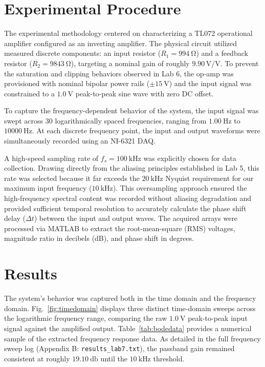 \documentclass[11pt]{article}
\begin{document}
\section{Experimental Procedure}
The experimental methodology centered on characterizing a TL072 operational amplifier configured as an inverting amplifier. The physical circuit utilized measured discrete components: an input resistor ($R_1 = \SI{994}{\ohm}$) and a feedback resistor ($R_2 = \SI{9843}{\ohm}$), targeting a nominal gain of roughly $9.90\,\text{V/V}$. To prevent the saturation and clipping behaviors observed in Lab 6, the op-amp was provisioned with nominal bipolar power rails ($\pm \SI{15}{\volt}$) and the input signal was constrained to a $\SI{1.0}{\volt}$ peak-to-peak sine wave with zero DC offset.

To capture the frequency-dependent behavior of the system, the input signal was swept across 30 logarithmically spaced frequencies, ranging from $\SI{1.00}{\hertz}$ to $\SI{10000}{\hertz}$. At each discrete frequency point, the input and output waveforms were simultaneously recorded using an NI-6321 DAQ.

A high-speed sampling rate of $f_s = \SI{100}{\kilo\hertz}$ was explicitly chosen for data collection. Drawing directly from the aliasing principles established in Lab 5, this rate was selected because it far exceeds the $\SI{20}{\kilo\hertz}$ Nyquist requirement for our maximum input frequency ($\SI{10}{\kilo\hertz}$). This oversampling approach ensured the high-frequency spectral content was recorded without aliasing degradation and provided sufficient temporal resolution to accurately calculate the phase shift delay ($\Delta t$) between the input and output waves. The acquired arrays were processed via MATLAB to extract the root-mean-square (RMS) voltages, magnitude ratio in decibels (dB), and phase shift in degrees.

\section{Results}
The system's behavior was captured both in the time domain and the frequency domain. Fig.~\ref{fig:timedomain} displays three distinct time-domain sweeps across the logarithmic frequency range, comparing the raw $\SI{1.0}{\volt}$ peak-to-peak input signal against the amplified output. Table~\ref{tab:bodedata} provides a numerical sample of the extracted frequency response data. As detailed in the full frequency sweep log (Appendix B: \texttt{results\_lab7.txt}), the passband gain remained consistent at roughly $\SI{19.10}{\decibel}$ until the $\SI{10}{\kilo\hertz}$ threshold.
\end{document}
